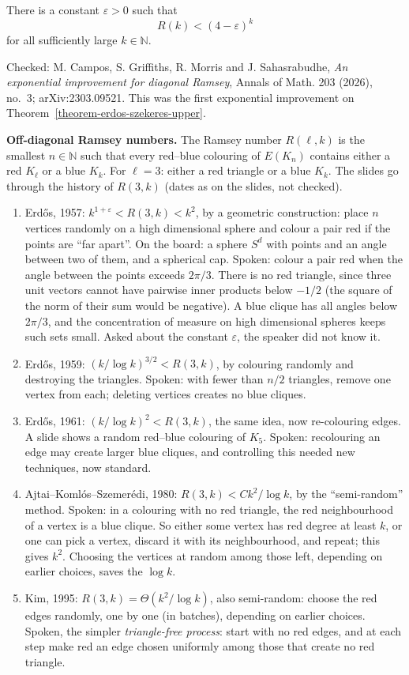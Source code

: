 \begin{theorem}
\label{theorem-cgms}
There is a constant $\varepsilon > 0$ such
that
$$
R(k) < (4 - \varepsilon)^k
$$
for all sufficiently large $k \in
\mathbb{N}$.
\end{theorem}

\noindent
Checked: M. Campos, S. Griffiths, R. Morris
and J. Sahasrabudhe, \emph{An exponential
improvement for diagonal Ramsey}, Annals of
Math. 203 (2026), no.~3; arXiv:2303.09521.
This was the first exponential improvement
on
Theorem~\ref{theorem-erdos-szekeres-upper}.

\medskip\noindent
{\bf Off-diagonal Ramsey numbers.} The
Ramsey number $R(\ell,k)$ is the smallest
$n \in \mathbb{N}$ such that every red--blue
colouring of $E(K_n)$ contains either a red
$K_\ell$ or a blue $K_k$. For $\ell = 3$:
either a red triangle or a blue $K_k$. The
slides go through the history of $R(3,k)$
(dates as on the slides, not checked).
\begin{enumerate}
\item Erd\H{o}s, 1957:
$k^{1+\varepsilon} < R(3,k) < k^2$, by a
geometric construction: place $n$ vertices
randomly on a high dimensional sphere and
colour a pair red if the points are ``far
apart''. On the board: a sphere $S^d$ with
points and an angle between two of them, and
a spherical cap. Spoken: colour a pair red
when the angle between the points exceeds
$2\pi/3$. There is no red triangle, since
three unit vectors cannot have pairwise inner
products below $-1/2$ (the square of the norm
of their sum would be negative). A blue
clique has all angles below $2\pi/3$, and the
concentration of measure on high dimensional
spheres keeps such sets small. Asked about
the constant $\varepsilon$, the speaker did
not know it.
\item Erd\H{o}s, 1959:
$(k/\log k)^{3/2} < R(3,k)$, by colouring
randomly and destroying the triangles.
Spoken: with fewer than $n/2$ triangles,
remove one vertex from each; deleting
vertices creates no blue cliques.
\item Erd\H{o}s, 1961:
$(k/\log k)^2 < R(3,k)$, the same idea, now
re-colouring edges. A slide shows a random
red--blue colouring of $K_5$. Spoken:
recolouring an edge may create larger blue
cliques, and controlling this needed new
techniques, now standard.
\item Ajtai--Koml\'os--Szemer\'edi, 1980:
$R(3,k) < C k^2/\log k$, by the
``semi-random'' method. Spoken: in a
colouring with no red triangle, the red
neighbourhood of a vertex is a blue clique.
So either some vertex has red degree at
least $k$, or one can pick a vertex, discard
it with its neighbourhood, and repeat; this
gives $k^2$. Choosing the vertices at random
among those left, depending on earlier
choices, saves the $\log k$.
\item Kim, 1995:
$R(3,k) = \Theta(k^2/\log k)$, also
semi-random: choose the red edges randomly,
one by one (in batches), depending on
earlier choices. Spoken, the simpler
\emph{triangle-free process}: start with no
red edges, and at each step make red an edge
chosen uniformly among those that create no
red triangle.
\end{enumerate}

